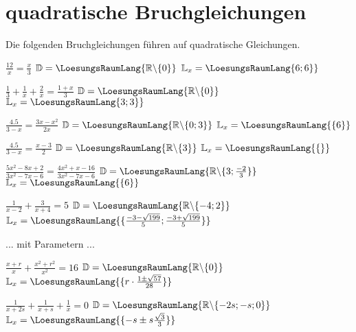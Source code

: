 \platzFuerBerechnungenBisEndeSeite{}

\section{quadratische Bruchgleichungen}
Die folgenden Bruchgleichungen führen auf quadratische Gleichungen.


\begin{bbwAufgabenBlock}
\item $\frac{12}x = \frac{x}3$ \hspace{10mm}   $\mathbb{D}= \LoesungsRaumLang{\mathbb{R}\backslash\{0\}}$  $\mathbb{L}_x = \LoesungsRaumLang{\-6; 6\}}$
\item $\frac13 + \frac1x + \frac2x = \frac{1+x}3$ \hspace{10mm}   $\mathbb{D}= \LoesungsRaumLang{\mathbb{R}\backslash\{0\}}$  $\mathbb{L}_x = \LoesungsRaumLang{\-3; 3\}}$
\item $\frac{4.5}{3-x} = \frac{3x-x^2}{2x}$ \hspace{10mm}   $\mathbb{D}= \LoesungsRaumLang{\mathbb{R}\backslash\{0;3\}}$  $\mathbb{L}_x = \LoesungsRaumLang{\{6\}}$\noTRAINER{\newpage}
\item $\frac{4.5}{3-x} = \frac{x-3}{2}$ \hspace{10mm}   $\mathbb{D}= \LoesungsRaumLang{\mathbb{R}\backslash\{3\}}$  $\mathbb{L}_x = \LoesungsRaumLang{\{\}}$
\item $\frac{5x^2-8x+2}{3x^2-7x-6}=\frac{4x^2+x-16}{3x^2-7x-6}$ \hspace{10mm}   $\mathbb{D}= \LoesungsRaumLang{\mathbb{R}\backslash\{3;\frac{-2}3\}}$  $\mathbb{L}_x = \LoesungsRaumLang{\{6\}}$
\item $\frac1{x-2} + \frac3{x+4} = 5$ \hspace{10mm}         $\mathbb{D}= \LoesungsRaumLang{\mathbb{R}\backslash\{-4;2\}}$          $\mathbb{L}_x = \LoesungsRaumLang{\{\frac{-3-\sqrt{199}}{5};\frac{-3+\sqrt{199}}{5} \}}$

\end{bbwAufgabenBlock}

\platzFuerBerechnungenBisEndeSeite{}



... mit Parametern ...


\begin{bbwAufgabenBlock}
\item $\frac{x+r}x + \frac{x^2+r^2}{x^2} = 16$ \hspace{10mm}         $\mathbb{D}= \LoesungsRaumLang{\mathbb{R}\backslash\{0\}}$          $\mathbb{L}_x = \LoesungsRaumLang{\{r\cdot{}\frac{1\pm\sqrt{57}}{28} \}}$
\item $\frac1{x+2s}+ \frac1{x+s} + \frac1{x}=0$ \hspace{10mm}
$\mathbb{D}= \LoesungsRaumLang{\mathbb{R}\backslash\{-2s;-s;0\}}$
$\mathbb{L}_x = \LoesungsRaumLang{\{-s\pm s\frac{\sqrt{3}}{3} \}}$

\end{bbwAufgabenBlock}

